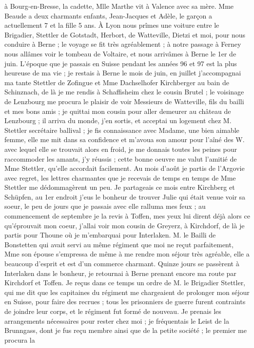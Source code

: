 \documentclass[12pt]{article}
\begin{document}
 à Bourg-en-Bresse, la cadette, Mlle Marthe vit à Valence
avec sa mère. Mme Beaude a deux charmants enfants, Jean-Jacques et Adèle, le garçon a actuellement 7
et la fille 5 ans. À Lyon nous prîmes une voiture entre le Brigadier, Stettler de Gotstadt, Herbort,
de Watteville, Dietzi et moi, pour nous conduire à Berne ; le voyage se fit très agréablement ; à
notre passage à Ferney nous allâmes voir le tombeau de Voltaire, et nous arrivâmes à Berne le 1er de
juin. L’époque que je passais en Suisse pendant les années 96 et 97 est la plus heureuse de ma vie ;
je restais à Berne le mois de juin, en juillet j’accompagnai ma tante Stettler de Zofingue et Mme
Dachselhofer Kirchberger au bain de Schinznach, de là je me rendis à Schaffisheim chez le cousin
Brutel ; le voisinage de Lenzbourg me procura le plaisir de voir Messieurs de Watteville, fils du
bailli et mes bons amis ; je quittai mon cousin pour aller demeurer au château de Lenzbourg ; il
arriva du monde, j’en sortis, et acceptai un logement chez M. Stettler secrétaire ballival ; je fis
connaissance avec Madame, une bien aimable femme, elle me mit dans sa confidence et m’avoua son
amour pour l’aîné des W. avec lequel elle se trouvait alors en froid, je me donnais toutes les
peines pour raccommoder les amants, j’y réussis ; cette bonne oeuvre me valut l’amitié de Mme
Stettler, qu’elle accordait facilement. Au mois d’août je partis de l’Argovie avec regret, les
lettres charmantes que je recevais de temps en temps de Mme Stettler me dédommagèrent un peu. Je
partageais ce mois entre Kirchberg et Schüpfen, au 1er endroit j’eus le bonheur de trouver Julie qui
était venue voir sa soeur, le peu de jours que je passais avec elle ralluma mes feux ; au
commencement de septembre je la revis à Toffen, mes yeux lui dirent déjà alors ce qu’éprouvait mon
coeur, j’allai voir mon cousin de Greyerz, à Kirchdorf, de là je partis pour Thoune où je
m’embarquai pour Interlaken. M. le Bailli de Bonstetten qui avait servi au même régiment que moi ne
reçut parfaitement, Mme son épouse s’empressa de même à me rendre mon séjour très agréable, elle a
beaucoup d’esprit et est d’un commerce charmant. Quinze jours se passèrent à Interlaken dans le
bonheur, je retournai à Berne prenant encore ma route par Kirchdorf et Toffen. Je reçus dans ce
temps un ordre de M. le Brigadier Stettler, qui me dit que les capitaines du régiment me chargeaient
de prolonger mon séjour en Suisse, pour faire des recrues ; tous les prisonniers de guerre furent
contraints de joindre leur corps, et le régiment fut formé de nouveau. Je prenais les arrangements
nécessaires pour rester chez moi ; je fréquentais le Leist de la Brunngass, dont je fus reçu membre
ainsi que de la petite société ; le premier me procura la
\end{document}
